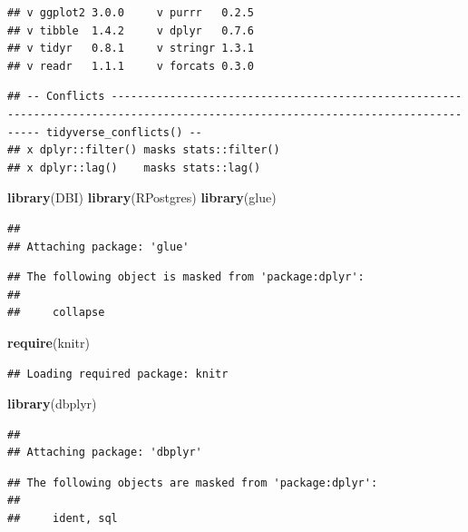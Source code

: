 \documentclass[]{book}
\newenvironment{Shaded}{\begin{snugshade}}{\end{snugshade}}
\newcommand{\KeywordTok}[1]{\textcolor[rgb]{0.13,0.29,0.53}{\textbf{#1}}}
\newcommand{\NormalTok}[1]{#1}
\theoremstyle{definition}
\theoremstyle{definition}
\theoremstyle{definition}
\theoremstyle{remark}
\begin{document}
\begin{verbatim}
## v ggplot2 3.0.0     v purrr   0.2.5
## v tibble  1.4.2     v dplyr   0.7.6
## v tidyr   0.8.1     v stringr 1.3.1
## v readr   1.1.1     v forcats 0.3.0
\end{verbatim}

\begin{verbatim}
## -- Conflicts --------------------------------------------------------------------------------------------------------------------------------- tidyverse_conflicts() --
## x dplyr::filter() masks stats::filter()
## x dplyr::lag()    masks stats::lag()
\end{verbatim}

\begin{Shaded}
\begin{Highlighting}[]
\KeywordTok{library}\NormalTok{(DBI)}
\KeywordTok{library}\NormalTok{(RPostgres)}
\KeywordTok{library}\NormalTok{(glue)}
\end{Highlighting}
\end{Shaded}

\begin{verbatim}
## 
## Attaching package: 'glue'
\end{verbatim}

\begin{verbatim}
## The following object is masked from 'package:dplyr':
## 
##     collapse
\end{verbatim}

\begin{Shaded}
\begin{Highlighting}[]
\KeywordTok{require}\NormalTok{(knitr)}
\end{Highlighting}
\end{Shaded}

\begin{verbatim}
## Loading required package: knitr
\end{verbatim}

\begin{Shaded}
\begin{Highlighting}[]
\KeywordTok{library}\NormalTok{(dbplyr)}
\end{Highlighting}
\end{Shaded}

\begin{verbatim}
## 
## Attaching package: 'dbplyr'
\end{verbatim}

\begin{verbatim}
## The following objects are masked from 'package:dplyr':
## 
##     ident, sql
\end{verbatim}
\end{document}
